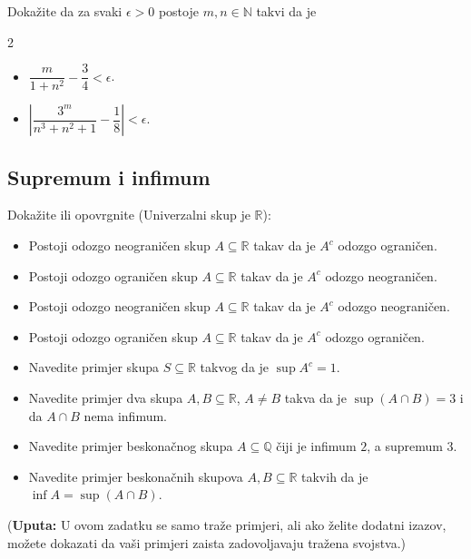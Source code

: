 \begin{exercise}{\unskip}
Dokažite da za svaki $\epsilon>0$ postoje $m, n\in \mathbb{N}$ takvi da je
\begin{multicols}{2}
\begin{itemize} 
\item[a)] $\dfrac{m}{1+n^2}-\dfrac{3}{4}<\epsilon$. 
\item[b)] $\left\lvert\dfrac{3^m}{n^3+n^2+1}-\dfrac{1}{8}\right\rvert<\epsilon$.
\end{itemize}
\end{multicols}
\end{exercise}
\subsection*{Supremum i infimum}
\begin{exercise}{\unskip} Dokažite ili opovrgnite (Univerzalni skup je \(\mathbb{R}\)):
\begin{itemize}
\item[a)] Postoji odozgo neograničen skup \(A\subseteq \mathbb{R}\) takav da je \(A^c\) odozgo ograničen.
\item[b)] Postoji odozgo ograničen skup \(A\subseteq \mathbb{R}\) takav da je \(A^c\) odozgo neograničen.
\item[c)] Postoji odozgo neograničen skup \(A\subseteq \mathbb{R}\) takav da je \(A^c\) odozgo neograničen.
\item[d)] Postoji odozgo ograničen skup \(A\subseteq \mathbb{R}\) takav da je \(A^c\) odozgo ograničen.
\end{itemize}
\end{exercise}
\begin{exercise}{\unskip}\textbf{}
\begin{itemize}
\item[a)] Navedite primjer skupa \(S\subseteq \mathbb{R}\) takvog da je \(\sup{A^c}=1\).
\item[b)] Navedite primjer dva skupa \(A, B\subseteq \mathbb{R}\), \(A\neq B\) takva da je \(\sup{\left(A\cap B\right)}=3\) i da \(A\cap B\) nema infimum.
\item[c)] Navedite primjer beskonačnog skupa \(A\subseteq \mathbb{Q}\) čiji je infimum \(2\), a supremum \(3\).
\item[d)] Navedite primjer beskonačnih skupova $A, B\subseteq \mathbb{R}$ takvih da je $\inf{A}=\sup{\left(A\cap B\right)}$.
\end{itemize}
(\textbf{Uputa:} U ovom zadatku se samo traže primjeri, ali ako želite dodatni izazov, možete dokazati da vaši primjeri zaista zadovoljavaju tražena svojstva.)
\end{exercise}
